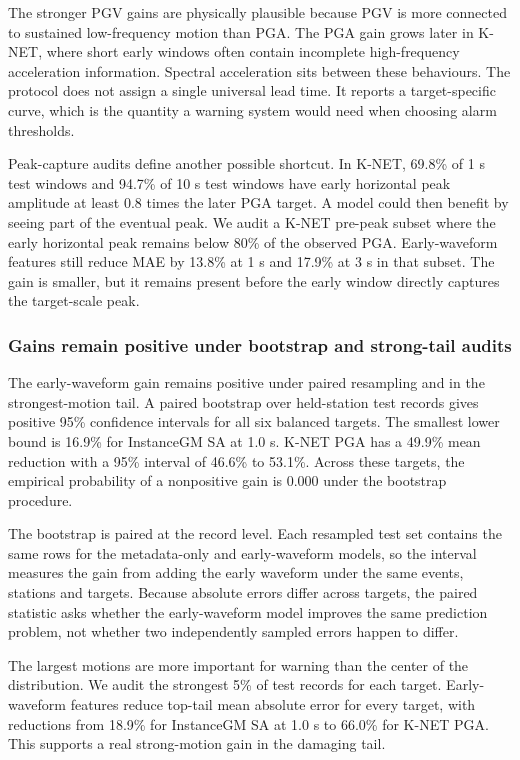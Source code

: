 \documentclass[
  10pt,
]{article}
\begin{document}
The stronger PGV gains are physically plausible because PGV is more
connected to sustained low-frequency motion than PGA. The PGA gain grows
later in K-NET, where short early windows often contain incomplete
high-frequency acceleration information. Spectral acceleration sits
between these behaviours. The protocol does not assign a single
universal lead time. It reports a target-specific curve, which is the
quantity a warning system would need when choosing alarm thresholds.

Peak-capture audits define another possible shortcut. In K-NET, 69.8\%
of 1 s test windows and 94.7\% of 10 s test windows have early
horizontal peak amplitude at least 0.8 times the later PGA target. A
model could then benefit by seeing part of the eventual peak. We audit a
K-NET pre-peak subset where the early horizontal peak remains below 80\%
of the observed PGA. Early-waveform features still reduce MAE by 13.8\%
at 1 s and 17.9\% at 3 s in that subset. The gain is smaller, but it
remains present before the early window directly captures the
target-scale peak.

\subsubsection{Gains remain positive under bootstrap and strong-tail
audits}\label{gains-remain-positive-under-bootstrap-and-strong-tail-audits}

The early-waveform gain remains positive under paired resampling and in
the strongest-motion tail. A paired bootstrap over held-station test
records gives positive 95\% confidence intervals for all six balanced
targets. The smallest lower bound is 16.9\% for InstanceGM SA at 1.0 s.
K-NET PGA has a 49.9\% mean reduction with a 95\% interval of 46.6\% to
53.1\%. Across these targets, the empirical probability of a nonpositive
gain is 0.000 under the bootstrap procedure.

The bootstrap is paired at the record level. Each resampled test set
contains the same rows for the metadata-only and early-waveform models,
so the interval measures the gain from adding the early waveform under
the same events, stations and targets. Because absolute errors differ
across targets, the paired statistic asks whether the early-waveform
model improves the same prediction problem, not whether two
independently sampled errors happen to differ.

The largest motions are more important for warning than the center of
the distribution. We audit the strongest 5\% of test records for each
target. Early-waveform features reduce top-tail mean absolute error for
every target, with reductions from 18.9\% for InstanceGM SA at 1.0 s to
66.0\% for K-NET PGA. This supports a real strong-motion gain in the
damaging tail.
\end{document}
